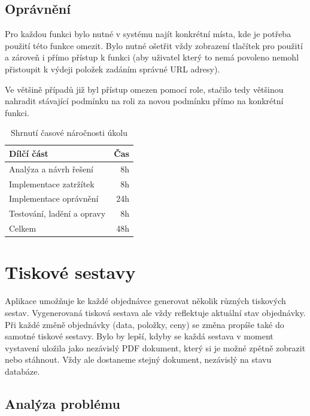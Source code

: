 \subsection{Oprávnění}

Pro každou funkci bylo nutné v systému najít konkrétní místa, kde je potřeba použití této funkce omezit. Bylo nutné ošetřit vždy zobrazení tlačítek pro použití a zároveň i přímo přístup k funkci (aby uživatel který to nemá povoleno nemohl přistoupit k výdeji položek zadáním správné URL adresy).

Ve většině případů již byl přístup omezen pomocí role, stačilo tedy většinou nahradit stávající podmínku na roli za novou podmínku přímo na konkrétní funkci.

\begin{table}
	\centering
	\caption[Časová náročnost úkolu na oprávnění]{Shrnutí časové náročnosti úkolu}
	\label{tab:TopLevelTableLabel}
		\begin{tabular}{lr}
			\toprule
			Dílčí část & Čas\\
			\midrule
			Analýza a návrh řešení & 8h \\
			Implementace zatržítek & 8h \\
            Implementace oprávnění & 24h \\
            Testování, ladění a opravy & 8h \\
            \midrule
            Celkem  & 48h \\
			\midrule
		\end{tabular}
\end{table}

\section{Tiskové sestavy}

Aplikace umožňuje ke každé objednávce generovat několik různých tiskových sestav. Vygenerovaná tisková sestava ale vždy reflektuje aktuální stav objednávky. Při každé změně objednávky (data, položky, ceny) se změna propíše také do samotné tiskové sestavy. Bylo by lepší, kdyby se každá sestava v moment vystavení uložila jako nezávislý PDF dokument, který si je možné zpětně zobrazit nebo stáhnout. Vždy ale dostaneme stejný dokument, nezávislý na stavu databáze.

\subsection{Analýza problému}


